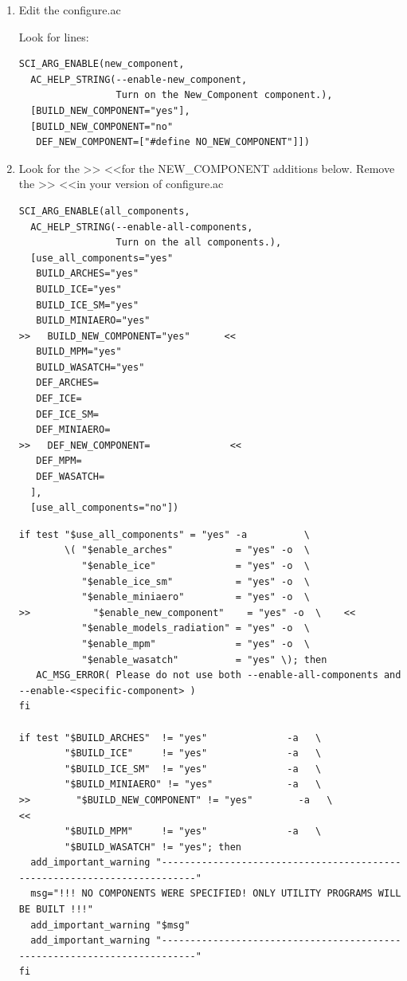 \documentclass[12pt]{report}
\begin{document}
\begin{enumerate}
\item  Edit the configure.ac

Look for lines:

\begin{verbatim}
SCI_ARG_ENABLE(new_component,
  AC_HELP_STRING(--enable-new_component,
                 Turn on the New_Component component.),
  [BUILD_NEW_COMPONENT="yes"],
  [BUILD_NEW_COMPONENT="no"
   DEF_NEW_COMPONENT=["#define NO_NEW_COMPONENT"]])

\end{verbatim}

\item  Look for the \textgreater\textgreater \space \space \space
  \textless\textless \space \space for the NEW\_COMPONENT additions below.
  Remove the \textgreater\textgreater \space \space \space
  \textless\textless \space \space in your version of configure.ac

\begin{verbatim}
SCI_ARG_ENABLE(all_components,
  AC_HELP_STRING(--enable-all-components,
                 Turn on the all components.),
  [use_all_components="yes"
   BUILD_ARCHES="yes"
   BUILD_ICE="yes"
   BUILD_ICE_SM="yes"   
   BUILD_MINIAERO="yes"
>>   BUILD_NEW_COMPONENT="yes"      <<
   BUILD_MPM="yes"
   BUILD_WASATCH="yes"
   DEF_ARCHES=
   DEF_ICE=
   DEF_ICE_SM=
   DEF_MINIAERO=
>>   DEF_NEW_COMPONENT=              <<
   DEF_MPM=
   DEF_WASATCH=
  ],
  [use_all_components="no"])
\end{verbatim}

\begin{verbatim}
if test "$use_all_components" = "yes" -a          \
        \( "$enable_arches"           = "yes" -o  \
           "$enable_ice"              = "yes" -o  \
           "$enable_ice_sm"           = "yes" -o  \
           "$enable_miniaero"         = "yes" -o  \
>>           "$enable_new_component"    = "yes" -o  \    <<
           "$enable_models_radiation" = "yes" -o  \
           "$enable_mpm"              = "yes" -o  \
           "$enable_wasatch"          = "yes" \); then
   AC_MSG_ERROR( Please do not use both --enable-all-components and --enable-<specific-component> )
fi

if test "$BUILD_ARCHES"  != "yes"              -a   \
        "$BUILD_ICE"     != "yes"              -a   \
        "$BUILD_ICE_SM"  != "yes"              -a   \
        "$BUILD_MINIAERO" != "yes"             -a   \
>>        "$BUILD_NEW_COMPONENT" != "yes"        -a   \           <<
        "$BUILD_MPM"     != "yes"              -a   \
        "$BUILD_WASATCH" != "yes"; then
  add_important_warning "-------------------------------------------------------------------------"
  msg="!!! NO COMPONENTS WERE SPECIFIED! ONLY UTILITY PROGRAMS WILL BE BUILT !!!"
  add_important_warning "$msg"
  add_important_warning "-------------------------------------------------------------------------"
fi


\end{verbatim}
\end{enumerate}
\end{document}
